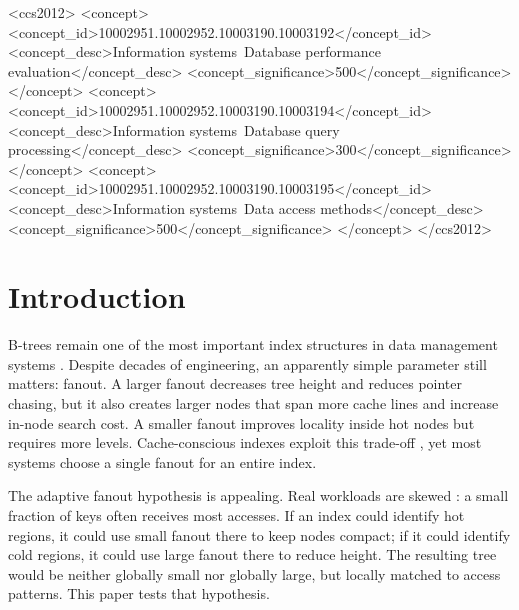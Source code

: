 \documentclass[sigconf,screen]{acmart}
\begin{document}
\begin{CCSXML}
<ccs2012>
 <concept>
  <concept_id>10002951.10002952.10003190.10003192</concept_id>
  <concept_desc>Information systems~Database performance evaluation</concept_desc>
  <concept_significance>500</concept_significance>
 </concept>
 <concept>
  <concept_id>10002951.10002952.10003190.10003194</concept_id>
  <concept_desc>Information systems~Database query processing</concept_desc>
  <concept_significance>300</concept_significance>
 </concept>
 <concept>
  <concept_id>10002951.10002952.10003190.10003195</concept_id>
  <concept_desc>Information systems~Data access methods</concept_desc>
  <concept_significance>500</concept_significance>
 </concept>
</ccs2012>
\end{CCSXML}



\maketitle

\section{Introduction}

B-trees remain one of the most important index structures in data management
systems \cite{bayer1972organization,comer1979ubiquitous,graefe2011modern}.
Despite decades of engineering, an apparently simple parameter still matters:
fanout.  A larger fanout decreases tree height and reduces pointer chasing,
but it also creates larger nodes that span more cache lines and increase
in-node search cost.  A smaller fanout improves locality inside hot nodes but
requires more levels.  Cache-conscious indexes exploit this trade-off
\cite{rao1999cache,rao2000making,chen2001fractal}, yet most systems choose a
single fanout for an entire index.

The adaptive fanout hypothesis is appealing.  Real workloads are skewed
\cite{zipf1949human,cooper2010benchmarking}: a small fraction of keys often
receives most accesses.  If an index could identify hot regions, it could use
small fanout there to keep nodes compact; if it could identify cold regions, it
could use large fanout there to reduce height.  The resulting tree would be
neither globally small nor globally large, but locally matched to access
patterns.  This paper tests that hypothesis.
\end{document}
